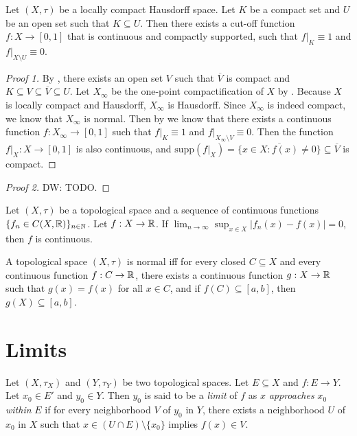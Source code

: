 \documentclass[screen]{techreport}
\numberwithin{equation}{section}
\newcommand{\diw}[1]{{\color{Red} DW: #1}}
\begin{document}
\begin{theorem}\label{The:LocCompT2StrongerCutOff}
	Let $(X,\tau)$ be a locally compact Hausdorff space.
	Let $K$ be a compact set and $U$ be an open set such that $K \subseteq U$.
	Then there exists a cut-off function $f : X \to [0,1]$ that is continuous and compactly supported, such that $f|_K \equiv 1$ and $f|_{X \setminus U} \equiv 0$.
\end{theorem}
\begin{proof}[Proof 1]
	By , there exists an open set $V$ such that $\overline{V}$ is compact and $K \subseteq V \subseteq \overline{V} \subseteq U$.
	Let $X_\infty$ be the one-point compactification of $X$ by .
	Because $X$ is locally compact and Hausdorff, $X_\infty$ is Hausdorff.
	Since $X_\infty$ is indeed compact, we know that $X_\infty$ is normal.
	Then by  we know that there exists a continuous function $f : X_\infty \to [0,1]$ such that $f|_K \equiv 1$ and $f |_{X_\infty \setminus V } \equiv 0$.
	Then the function $f|_X : X \to [0,1]$ is also continuous, and $\mathrm{supp}(f|_X) = \overline{\{x \in X: f(x) \neq 0\}} \subseteq \overline{V}$ is compact.
\end{proof}
\begin{proof}[Proof 2]
	\diw{TODO.}
\end{proof}

\begin{lemma}\label{Lem:UniformContinuous}
	Let $(X,\tau)$ be a topological space and a sequence of continuous functions $\{f_n \in C(X,\mathbb{R})\}_{n \in \mathbb{N}}$.
	Let $f : X \to \mathbb{R}$.
	If $\lim_{n \to \infty} \sup_{x \in X} |f_n(x) - f(x)| = 0$, then $f$ is continuous.
\end{lemma}

\begin{theorem}\label{The:TietzeExtension}
	A topological space $(X,\tau)$ is normal iff for every closed $C \subseteq X$ and every continuous function $f: C \to \mathbb{R}$, there exists a continuous function $g: X \to \mathbb{R}$ such that $g(x) = f(x)$ for all $x \in C$, and if $f(C) \subseteq [a,b]$, then $g(X) \subseteq [a,b]$.
\end{theorem}

\section{Limits}

\begin{definition}\label{De:Limits}
	Let $(X,\tau_X)$ and $(Y,\tau_Y)$ be two topological spaces.
	Let $E \subseteq X$ and $f: E \to Y$.
	Let $x_0 \in E'$ and $y_0 \in Y$.
	Then $y_0$ is said to be a \emph{limit} of $f$ as $x$ \emph{approaches} $x_0$ \emph{within} $E$ if for every neighborhood $V$ of $y_0$ in $Y$, there exists a neighborhood $U$ of $x_0$ in $X$ such that
	$x \in (U \cap E) \setminus \{x_0\}$ implies $f(x) \in V$.
\end{definition}
\end{document}
